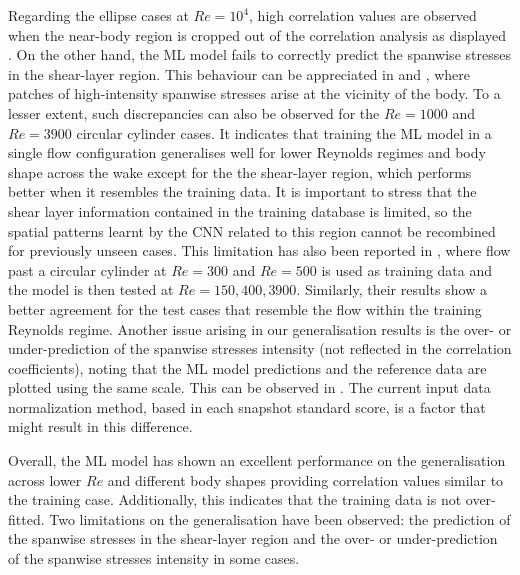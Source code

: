 \documentclass[../main.tex]{subfiles}
\begin{document}
Regarding the ellipse cases at $Re=10^4$, high correlation values are observed when the near-body region is cropped out of the correlation analysis as displayed .
On the other hand, the ML model fails to correctly predict the spanwise stresses in the shear-layer region.
This behaviour can be appreciated in  and , where patches of high-intensity spanwise stresses arise at the vicinity of the body.
To a lesser extent, such discrepancies can also be observed for the $Re=1000$ and $Re=3900$ circular cylinder cases.
It indicates that training the ML model in a single flow configuration generalises well for lower Reynolds regimes and body shape across the wake except for the the shear-layer region, which performs better when it resembles the training data.
It is important to stress that the shear layer information contained in the training database is limited, so the spatial patterns learnt by the CNN related to this region cannot be recombined for previously unseen cases.
This limitation has also been reported in \citet{Lee2019}, where flow past a circular cylinder at $Re=300$ and $Re=500$ is used as training data and the model is then tested at $Re=150,400,3900$.
Similarly, their results show a better agreement for the test cases that resemble the flow within the training Reynolds regime.
Another issue arising in our generalisation results is the over- or under-prediction of the spanwise stresses intensity (not reflected in the correlation coefficients), noting that the ML model predictions and the reference data are plotted using the same scale. 
This can be observed in .
The current input data normalization method, based in each snapshot standard score, is a factor that might result in this difference.

Overall, the ML model has shown an excellent performance on the generalisation across lower $Re$ and different body shapes providing correlation values similar to the training case.
Additionally, this indicates that the training data is not over-fitted.
Two limitations on the generalisation have been observed: the prediction of the spanwise stresses in the shear-layer region and the over- or under-prediction of the spanwise stresses intensity in some cases.

\clearpage
\end{document}
